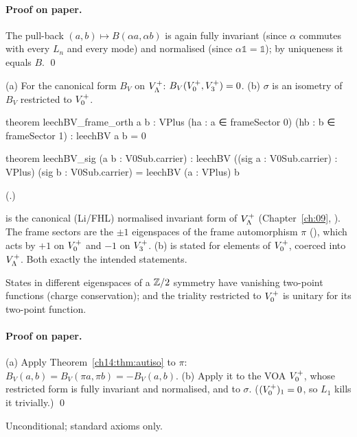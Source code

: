 \paragraph{Proof on paper.}  The pull-back $(a,b)\mapsto B(\alpha a,\alpha b)$ is again fully
invariant (since $\alpha$ commutes with every $L_n$ and every mode) and normalised (since
$\alpha\mathbb 1=\mathbb 1$); by uniqueness it equals $B$. \qed

\begin{corollary}\label{ch14:cor:orth}
(a) For the canonical form $B_V$ on $V_{\Lambda}^+$: $B_V(V_0^{+},V_3^{+})=0$.
(b) $\sigma$ is an isometry of $B_V$ restricted to $V_0^{+}$.
\end{corollary}
\begin{leancode}
theorem leechBV_frame_orth {a b : VPlus} (ha : a ∈ frameSector 0) (hb : b ∈ frameSector 1) :
    leechBV a b = 0

theorem leechBV_sig (a b : V0Sub.carrier) :
    leechBV ((sig a : V0Sub.carrier) : VPlus) (sig b : V0Sub.carrier) = leechBV (a : VPlus) b
\end{leancode}
(.)

\begin{dictionary}
 is the canonical (Li/FHL) normalised invariant form of $V_{\Lambda}^+$ (Chapter~\ref{ch:09},
).  The frame sectors are the $\pm1$ eigenspaces of the frame automorphism
$\pi$ (), which acts by $+1$ on $V_0^{+}$ and $-1$ on $V_3^{+}$.  (b) is stated for
elements of $V_0^{+}$, coerced into $V_{\Lambda}^+$.  Both exactly the intended statements.
\end{dictionary}
\begin{physics}
States in different eigenspaces of a ${\mathbb{Z}}/2$ symmetry have vanishing two-point functions (charge conservation); and the triality restricted to $V_0^{+}$ is unitary for its two-point function.
\end{physics}


\paragraph{Proof on paper.}  (a) Apply Theorem~\ref{ch14:thm:autiso} to $\pi$:
$B_V(a,b)=B_V(\pi a,\pi b)=-B_V(a,b)$.  (b) Apply it to the VOA $V_0^{+}$, whose restricted form is
fully invariant and normalised, and to $\sigma$.  ($(V_0^{+})_1=0$, so $L_1$ kills it trivially.) \qed

\begin{status}Unconditional; standard axioms only.\end{status}


